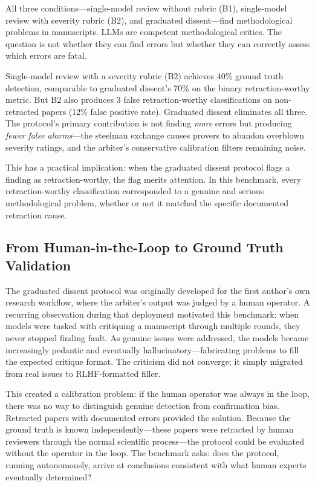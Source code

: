 \documentclass[11pt]{article}
\begin{document}
All three conditions---single-model review without rubric (B1), single-model review with severity rubric (B2), and graduated dissent---find methodological problems in manuscripts. LLMs are competent methodological critics. The question is not whether they can find errors but whether they can correctly assess which errors are fatal.

Single-model review with a severity rubric (B2) achieves 40\% ground truth detection, comparable to graduated dissent's 70\% on the binary retraction-worthy metric. But B2 also produces 3 false retraction-worthy classifications on non-retracted papers (12\% false positive rate). Graduated dissent eliminates all three. The protocol's primary contribution is not finding \emph{more} errors but producing \emph{fewer false alarms}---the steelman exchange causes provers to abandon overblown severity ratings, and the arbiter's conservative calibration filters remaining noise.

This has a practical implication: when the graduated dissent protocol flags a finding as retraction-worthy, the flag merits attention. In this benchmark, every retraction-worthy classification corresponded to a genuine and serious methodological problem, whether or not it matched the specific documented retraction cause.

\subsection{From Human-in-the-Loop to Ground Truth Validation}

The graduated dissent protocol was originally developed for the first author's own research workflow, where the arbiter's output was judged by a human operator. A recurring observation during that deployment motivated this benchmark: when models were tasked with critiquing a manuscript through multiple rounds, they never stopped finding fault. As genuine issues were addressed, the models became increasingly pedantic and eventually hallucinatory---fabricating problems to fill the expected critique format. The criticism did not converge; it simply migrated from real issues to RLHF-formatted filler.

This created a calibration problem: if the human operator was always in the loop, there was no way to distinguish genuine detection from confirmation bias. Retracted papers with documented errors provided the solution. Because the ground truth is known independently---these papers were retracted by human reviewers through the normal scientific process---the protocol could be evaluated without the operator in the loop. The benchmark asks: does the protocol, running autonomously, arrive at conclusions consistent with what human experts eventually determined?
\end{document}
